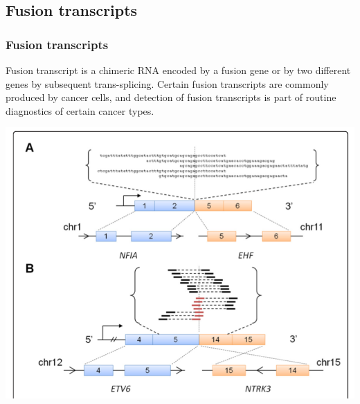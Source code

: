 \documentclass[pdf]{beamer}
\begin{document}
\subsection{Fusion transcripts}
\begin{frame}
  \frametitle{Fusion transcripts}
  Fusion transcript is a chimeric RNA encoded by a fusion gene or by two different genes by subsequent trans-splicing. Certain fusion transcripts are commonly produced by cancer cells, and detection of fusion transcripts is part of routine diagnostics of certain cancer types.
  \begin{center}
  \includegraphics[scale=0.22]{Figures/fusion.png} 
  \end{center}
\end{frame}

  
\end{document}
